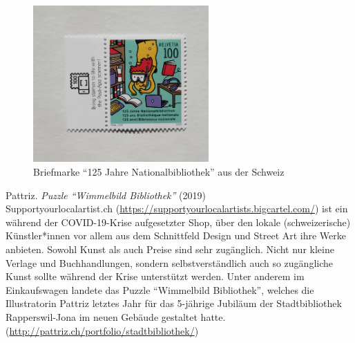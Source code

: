 \documentclass[a4paper,
fontsize=11pt,
oneside,
numbers=noperiodatend,
parskip=half-,
bibliography=totoc,
final
]{scrartcl}
\begin{document}
\begin{figure}[h!]
\centering
\includegraphics[width=0.6\textwidth]{img/schweiz-nationalbibliothek.jpg}
\caption{Briefmarke ``125 Jahre Nationalbibliothek'' aus der Schweiz}
\end{figure}

Pattriz. \emph{Puzzle ``Wimmelbild Bibliothek''} (2019)\\
Supportyourlocalartist.ch
(\url{https://supportyourlocalartists.bigcartel.com/}) ist ein während
der COVID-19-Krise aufgesetzter Shop, über den lokale (schweizerische)
Künstler*innen vor allem aus dem Schnittfeld Design und Street Art ihre
Werke anbieten. Sowohl Kunst als auch Preise sind sehr zugänglich. Nicht
nur kleine Verlage und Buchhandlungen, sondern selbstverständlich auch
so zugängliche Kunst sollte während der Krise unterstützt werden. Unter
anderem im Einkaufswagen landete das Puzzle ``Wimmelbild Bibliothek'',
welches die Illustratorin Pattriz letztes Jahr für das 5-jährige
Jubiläum der Stadtbibliothek Rapperswil-Jona im neuen Gebäude gestaltet
hatte. (\url{http://pattriz.ch/portfolio/stadtbibliothek/})
\end{document}
